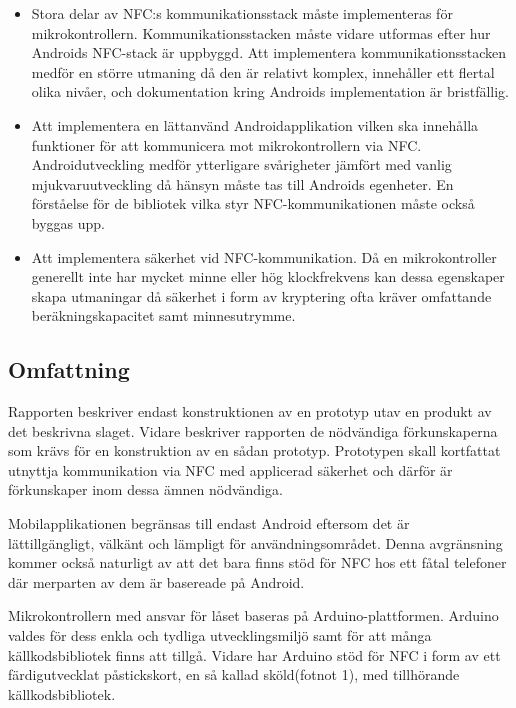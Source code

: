 \documentclass[11pt]{article}
\begin{document}
\begin{itemize}

\item Stora delar av NFC:s  kommunikationsstack måste implementeras för mikrokontrollern. Kommunikationsstacken måste vidare utformas efter hur Androids NFC-stack är uppbyggd. Att implementera kommunikationsstacken  medför en större utmaning då den är relativt komplex, innehåller ett flertal olika nivåer, och dokumentation kring Androids implementation är bristfällig.

\item Att implementera en lättanvänd Androidapplikation vilken ska innehålla funktioner för att kommunicera mot mikrokontrollern via NFC. Androidutveckling medför ytterligare svårigheter jämfört med vanlig mjukvaruutveckling då hänsyn måste tas till Androids egenheter. En förståelse för de bibliotek vilka styr NFC-kommunikationen måste också byggas upp.

\item Att implementera säkerhet vid NFC-kommunikation. Då en mikrokontroller generellt inte har mycket minne eller hög klockfrekvens kan dessa egenskaper skapa utmaningar då säkerhet i form av kryptering ofta kräver omfattande beräkningskapacitet samt minnesutrymme. 

\end{itemize}

\subsection{Omfattning}
Rapporten beskriver endast konstruktionen av en prototyp utav en produkt av det beskrivna slaget. Vidare beskriver rapporten de nödvändiga förkunskaperna som krävs för en konstruktion av en sådan prototyp. Prototypen skall kortfattat utnyttja kommunikation via NFC med applicerad säkerhet och därför är förkunskaper inom dessa ämnen nödvändiga. 

Mobilapplikationen begränsas till endast Android eftersom det är\\ lättillgängligt, välkänt och lämpligt för användningsområdet. Denna avgränsning kommer också naturligt av att det bara finns stöd för NFC hos ett fåtal telefoner där merparten av dem är basereade på Android.

Mikrokontrollern med ansvar för låset baseras på Arduino-plattformen. Arduino valdes för dess enkla och tydliga utvecklingsmiljö samt för att många källkodsbibliotek finns att tillgå. Vidare har Arduino stöd för NFC i form av ett färdigutvecklat påstickskort, en så kallad sköld(fotnot 1), med tillhörande källkodsbibliotek.
\end{document}
